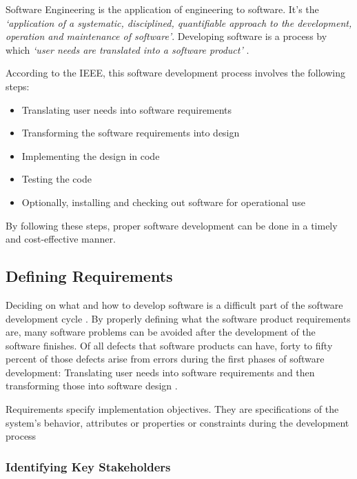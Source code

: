 Software Engineering is the application of engineering to software. It's the \textit{`application of a systematic, disciplined, quantifiable approach to the development, operation and maintenance of software'}. Developing software is a process by which \textit{`user needs are translated into a software product'} \parencite{8016712}.

According to the IEEE, this software development process involves the following steps:

\begin{itemize}

    \item Translating user needs into software requirements
    \item Transforming the software requirements into design
    \item Implementing the design in code
    \item Testing the code
    \item Optionally, installing and checking out software for operational use   
\end{itemize}

By following these steps, proper software development can be done in a timely and cost-effective manner.

\subsection{Defining Requirements}\label{state-of-the-art:ss:defining-requirements}

Deciding on what and how to develop software is a difficult part of the software development cycle \parencite{pacheco_garcía_reyes_2018}.
By properly defining what the software product requirements are, many software problems can be avoided after the development of the software finishes. Of all defects that software products can have, forty to fifty percent of those defects arise from errors during the first phases of software development: Translating user needs into software requirements and then transforming those into software design \Parencite{eugene_wiegers_beatty_2013}. 

Requirements specify implementation objectives. They are specifications of the system's behavior, attributes or properties or constraints during the development process \Parencite{sommerville_sawyer_1997}

\subsubsection{Identifying Key Stakeholders}\label{state-of-the-art:sss:identifying-key-stakeholders}

